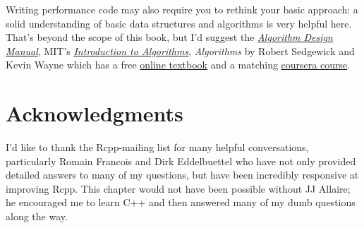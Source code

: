 Writing performance code may also require you to rethink your basic
approach: a solid understanding of basic data structures and algorithms
is very helpful here. That's beyond the scope of this book, but I'd
suggest the
\href{http://amzn.com/0387948600?tag=devtools-20}{\emph{Algorithm Design
Manual}}, MIT's
\href{http://ocw.mit.edu/courses/electrical-engineering-and-computer-science/6-046j-introduction-to-algorithms-sma-5503-fall-2005/}{\emph{Introduction
to Algorithms}}, \emph{Algorithms} by Robert Sedgewick and Kevin Wayne
which has a free \href{http://algs4.cs.princeton.edu/home/}{online
textbook} and a matching
\href{https://www.coursera.org/course/algs4partI}{coursera course}.

\hypertarget{acknowledgments}{%
\section{Acknowledgments}\label{acknowledgments}}

I'd like to thank the Rcpp-mailing list for many helpful conversations,
particularly Romain Francois and Dirk Eddelbuettel who have not only
provided detailed answers to many of my questions, but have been
incredibly responsive at improving Rcpp. This chapter would not have
been possible without JJ Allaire; he encouraged me to learn C++ and then
answered many of my dumb questions along the way.
